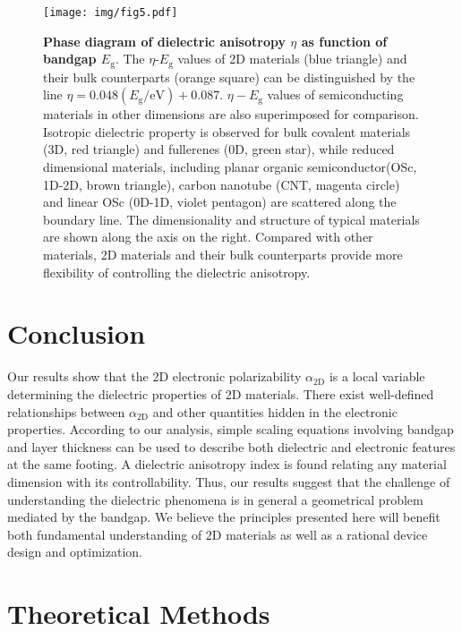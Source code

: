 \documentclass[journal=ancac3,manuscript=article,email=true,hyperref=true,keywords=false]{achemso}
\begin{document}
\begin{figure}[H]
  \centering
  \texttt{[image: img/fig5.pdf]}
  \caption{\textbf{Phase diagram of dielectric anisotropy $\eta$ as
      function of bandgap $E_{\mathrm{g}}$}. The
    $\eta$-$E_{\mathrm{g}}$ values of 2D materials (blue triangle) and
    their bulk counterparts (orange square) can be distinguished by
    the line $\eta=0.048(E_{\mathrm{g}}/\mathrm{eV})+0.087$. $\eta-E_{\mathrm{g}}$ values of
    semiconducting materials in other dimensions are also superimposed
    for comparison. Isotropic dielectric property is observed for bulk
    covalent materials (3D, red triangle) and fullerenes (0D, green
    star), while reduced dimensional materials, including planar
    organic semiconductor(OSc, 1D-2D, brown triangle), carbon nanotube
    (CNT, magenta circle) and linear OSc (0D-1D, violet pentagon) are
    scattered along the boundary line. The dimensionality and
    structure of typical materials are shown along the axis on the
    right. Compared with other materials, 2D materials and their bulk
    counterparts provide more flexibility of controlling the
    dielectric anisotropy.}
  \label{fig:aniso}
\end{figure}



\section{Conclusion}

Our results show that the 2D electronic polarizability
$\alpha_{\mathrm{2D}}$ is a local variable determining the dielectric
properties of 2D materials.  There exist well-defined relationships
between $\alpha_{\mathrm{2D}}$ and other quantities hidden in the
electronic properties.  According to our analysis, simple scaling
equations involving bandgap and layer thickness can be used to
describe both dielectric and electronic features at the same
footing. A dielectric anisotropy index is found relating any material
dimension with its controllability.  Thus, our results suggest that
the challenge of understanding the dielectric phenomena is in general
a geometrical problem mediated by the bandgap. We believe the
principles presented here will benefit both fundamental understanding
of 2D materials as well as a rational device design and optimization.




\section{Theoretical Methods}
\label{sec:org8457dbb}
\end{document}

